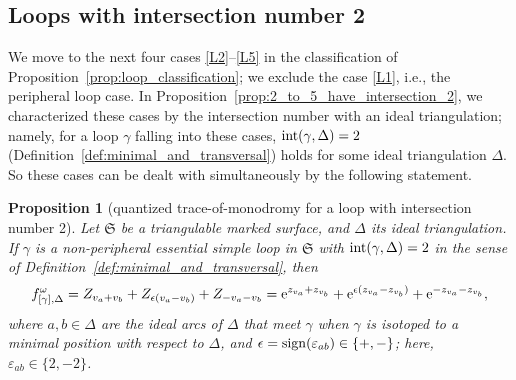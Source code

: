 \documentclass[pdftex]{sigma}
\numberwithin{equation}{section}
\newtheorem{Proposition}[Theorem]{Proposition}
\theoremstyle{definition}
\begin{document}
\subsection{Loops with intersection number 2}\label{subsec:loops_with_intersection_number_2}
We move to the next four cases \ref{L2}--\ref{L5} in the classification of Proposition~\ref{prop:loop_classification}; we exclude the case \ref{L1}, i.e., the peripheral loop case. In Proposition~\ref{prop:2_to_5_have_intersection_2}, we characterized these cases by the intersection number with an ideal triangulation; namely, for a loop $\gamma$ falling into these cases, ${\rm int}(\gamma,\Delta)=2$ (Definition~\ref{def:minimal_and_transversal}) holds for some ideal triangulation $\Delta$.
So these cases can be dealt with simultaneously by the following statement.
\begin{Proposition}[quantized trace-of-monodromy for a loop with intersection number 2]
\label{prop:quantized_trace-of-monodromy_for_loop_with_int_2}
Let $\mathfrak{S}$ be a triangulable marked surface, and $\Delta$ its ideal triangulation. If $\gamma$ is a non-peripheral essential simple loop in $\mathfrak{S}$ with ${\rm int}(\gamma,\Delta)=2$ in the sense of Definition~{\rm \ref{def:minimal_and_transversal}}, then
\begin{align*}
f^\omega_{[\gamma],\Delta} = Z_{v_a + v_b} + Z_{\epsilon(v_a - v_b)} + Z_{-v_a-v_b}
 = {\rm e}^{z_{v_a} + z_{v_b}} + {\rm e}^{\epsilon(z_{v_a} - z_{v_b})} + {\rm e}^{-z_{v_a} - z_{v_b}},
\end{align*}
where $a,b \in \Delta$ are the ideal arcs of $\Delta$ that meet $\gamma$ when $\gamma$ is isotoped to a minimal position with respect to $\Delta$, and $\epsilon = {\rm sign}(\varepsilon_{ab}) \in \{+,-\}$; here, $\varepsilon_{ab} \in \{2,-2\}$.
\end{Proposition}
\end{document}
